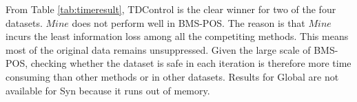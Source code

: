 \begin{table}[bh]
\end{table}

From Table \ref{tab:timeresult}, TDControl is the clear winner
for two of the four datasets. $Mine$ does not perform well in BMS-POS.
The reason is that $Mine$ incurs the least information loss among all the
competiting methods. This means most of the original data remains
unsuppressed. Given the large scale of BMS-POS, checking whether the
dataset is safe in each iteration is therefore more time consuming than
other methods or in other datasets.
Results for Global are not available for Syn because
it runs out of memory.

